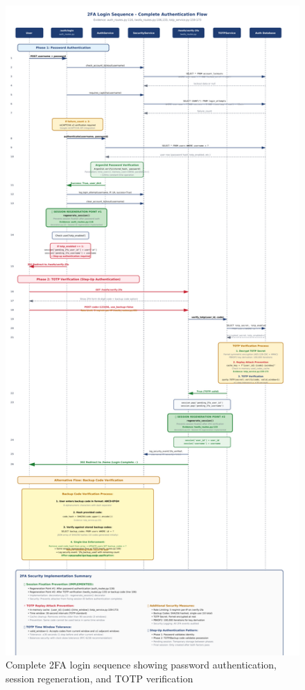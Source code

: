 \documentclass[12pt,a4paper]{article}
\begin{document}
\begin{figure}[H]
    \centering
    \includegraphics[width=\textwidth]{diagrams/5_2fa_login_sequence.pdf}
    \caption{Complete 2FA login sequence showing password authentication, session regeneration, and TOTP verification}
    \label{fig:2fa_flow}
\end{figure}
\end{document}
